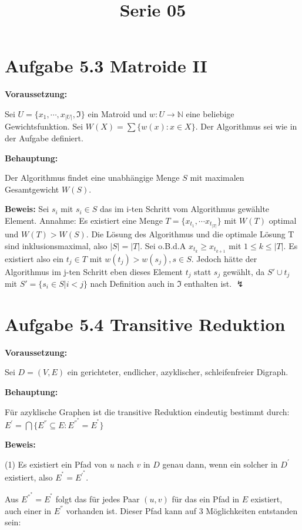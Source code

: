  
\title{Serie 05}

 

\section*{Aufgabe 5.3 Matroide II}

\textbf{Voraussetzung: }

Sei $U=\{x_1, \cdots, x_{|U|}, \mathfrak{I}\}$ ein Matroid und $w: U \rightarrow \mathbb{N}$ eine beliebige Gewichtsfunktion. Sei $W(X) = \sum\{w(x) : x \in X\}$. Der Algorithmus sei wie in der Aufgabe definiert.

\noindent
\textbf{Behauptung: } 

Der Algorithmus findet eine unabhängige Menge $S$ mit maximalen Gesamtgewicht $W(S)$.

\noindent
\textbf{Beweis: }
Sei $s_i$ mit $s_i \in S$ das im i-ten Schritt vom Algorithmus gewählte Element.
Annahme: Es existiert eine Menge $T = \{x_{t_1}, \cdots x_{t_{|T|}}\}$ mit $W(T)$ optimal und $W(T) > W(S)$. 
Die Lösung des Algorithmus und die optimale Lösung T sind inklusionsmaximal, also $|S| = |T|$. Sei o.B.d.A $x_{t_k} \geq x_{t_{k+1}}$ mit $ 1 \leq k \leq |T|$. Es existiert also ein $t_j \in T$ mit $w(t_j) > w(s_j), s \in S$. Jedoch hätte der Algorithmus im j-ten Schritt eben dieses Element $t_j$ statt $s_j$ gewählt, da $S' \cup t_j$ mit $S' = \{s_i \in S | i < j\}$ nach Definition auch in $\mathfrak{I}$ enthalten ist. $\lightning$

\clearpage

\section*{Aufgabe 5.4 Transitive Reduktion}
\textbf{Voraussetzung: }

Sei $D = (V,E)$ ein gerichteter, endlicher, azyklischer, schleifenfreier Digraph. 

\noindent
\textbf{Behauptung: } 

Für azyklische Graphen ist die transitive Reduktion eindeutig bestimmt durch:\\ 
$E^{'} = \bigcap \{ E^{''} \subseteq E : E^{''^*} = E^{^*} \}$

\noindent
\textbf{Beweis: }

(1) Es existiert ein Pfad von $u$ nach $v$ in $D$ genau dann, wenn ein solcher in $D^{'}$ existiert, also $E^{^*} = E^{'^*}$.

Aus $E^{''^*} = E^{^*}$ folgt das für jedes Paar $(u,v)$ für das ein Pfad in $E$ existiert, auch einer in $E^{''}$ vorhanden ist. Dieser Pfad kann auf 3 Möglichkeiten entstanden sein: 

